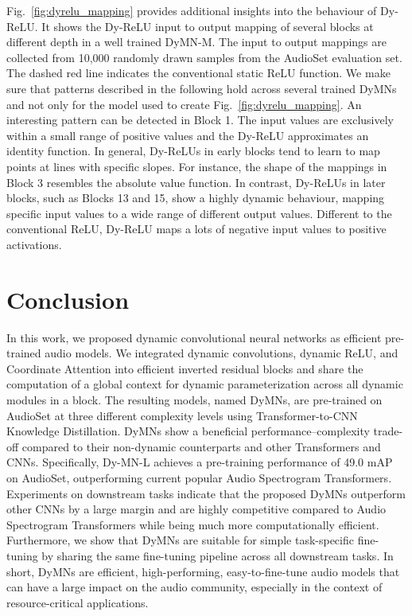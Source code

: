 \documentclass[lettersize,journal]{IEEEtran}
\begin{document}
Fig.~\ref{fig:dyrelu_mapping} provides additional insights into the behaviour of Dy-ReLU. It shows the Dy-ReLU input to output mapping of several blocks at different depth in a well trained \mbox{DyMN-M}. The input to output mappings are collected from 10,000 randomly drawn samples from the AudioSet evaluation set. The dashed red line indicates the conventional static ReLU function. We make sure that patterns described in the following hold across several trained DyMNs and not only for the model used to create Fig.~\ref{fig:dyrelu_mapping}. An interesting pattern can be detected in Block 1. The input values are exclusively within a small range of positive values and the Dy-ReLU approximates an identity function. In general, Dy-ReLUs in early blocks tend to learn to map points at lines with specific slopes. For instance, the shape of the mappings in Block 3 resembles the absolute value function. In contrast, Dy-ReLUs in later blocks, such as Blocks 13 and 15, show a highly dynamic behaviour, mapping specific input values to a wide range of different output values. Different to the conventional ReLU, Dy-ReLU maps a lots of negative input values to positive activations. 



\section {Conclusion}
\label{sec:conlusion}

In this work, we proposed dynamic convolutional neural networks as efficient pre-trained audio models. We integrated dynamic convolutions, dynamic ReLU, and Coordinate Attention into efficient inverted residual blocks and share the computation of a global context for dynamic parameterization across all dynamic modules in a block. The resulting models, named DyMNs, are pre-trained on AudioSet at three different complexity levels using Transformer-to-CNN Knowledge Distillation. DyMNs show a beneficial performance--complexity trade-off compared to their non-dynamic counterparts and other Transformers and CNNs. Specifically, Dy-MN-L achieves a pre-training performance of 49.0 mAP on AudioSet, outperforming current popular Audio Spectrogram Transformers. Experiments on downstream tasks indicate that the proposed DyMNs outperform other CNNs by a large margin and are highly competitive compared to Audio Spectrogram Transformers while being much more computationally efficient. Furthermore, we show that DyMNs are suitable for simple task-specific fine-tuning by sharing the same fine-tuning pipeline across all downstream tasks. In short, DyMNs are efficient, high-performing, easy-to-fine-tune audio models that can have a large impact on the audio community, especially in the context of resource-critical applications.
\end{document}

